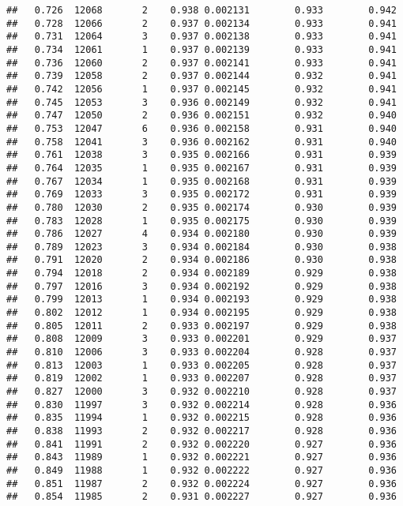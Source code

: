 \documentclass[
]{book}
\begin{document}
\begin{verbatim}
##   0.726  12068       2    0.938 0.002131        0.933        0.942
##   0.728  12066       2    0.937 0.002134        0.933        0.941
##   0.731  12064       3    0.937 0.002138        0.933        0.941
##   0.734  12061       1    0.937 0.002139        0.933        0.941
##   0.736  12060       2    0.937 0.002141        0.933        0.941
##   0.739  12058       2    0.937 0.002144        0.932        0.941
##   0.742  12056       1    0.937 0.002145        0.932        0.941
##   0.745  12053       3    0.936 0.002149        0.932        0.941
##   0.747  12050       2    0.936 0.002151        0.932        0.940
##   0.753  12047       6    0.936 0.002158        0.931        0.940
##   0.758  12041       3    0.936 0.002162        0.931        0.940
##   0.761  12038       3    0.935 0.002166        0.931        0.939
##   0.764  12035       1    0.935 0.002167        0.931        0.939
##   0.767  12034       1    0.935 0.002168        0.931        0.939
##   0.769  12033       3    0.935 0.002172        0.931        0.939
##   0.780  12030       2    0.935 0.002174        0.930        0.939
##   0.783  12028       1    0.935 0.002175        0.930        0.939
##   0.786  12027       4    0.934 0.002180        0.930        0.939
##   0.789  12023       3    0.934 0.002184        0.930        0.938
##   0.791  12020       2    0.934 0.002186        0.930        0.938
##   0.794  12018       2    0.934 0.002189        0.929        0.938
##   0.797  12016       3    0.934 0.002192        0.929        0.938
##   0.799  12013       1    0.934 0.002193        0.929        0.938
##   0.802  12012       1    0.934 0.002195        0.929        0.938
##   0.805  12011       2    0.933 0.002197        0.929        0.938
##   0.808  12009       3    0.933 0.002201        0.929        0.937
##   0.810  12006       3    0.933 0.002204        0.928        0.937
##   0.813  12003       1    0.933 0.002205        0.928        0.937
##   0.819  12002       1    0.933 0.002207        0.928        0.937
##   0.827  12000       3    0.932 0.002210        0.928        0.937
##   0.830  11997       3    0.932 0.002214        0.928        0.936
##   0.835  11994       1    0.932 0.002215        0.928        0.936
##   0.838  11993       2    0.932 0.002217        0.928        0.936
##   0.841  11991       2    0.932 0.002220        0.927        0.936
##   0.843  11989       1    0.932 0.002221        0.927        0.936
##   0.849  11988       1    0.932 0.002222        0.927        0.936
##   0.851  11987       2    0.932 0.002224        0.927        0.936
##   0.854  11985       2    0.931 0.002227        0.927        0.936

\end{verbatim}
\end{document}
